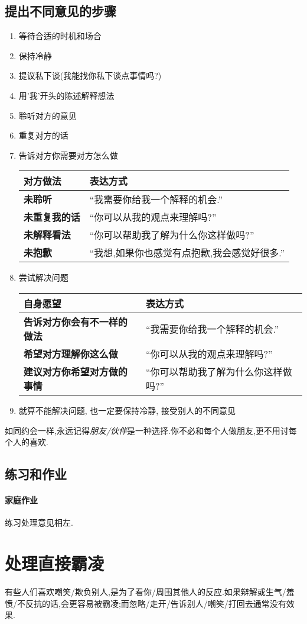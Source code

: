 \documentclass[UTF8]{article}
\newcommand{\Exer}{\subsection{练习和作业}}
\newcommand{\exer}{\paragraph*{家庭作业}}
\begin{document}
\subsection{提出不同意见的步骤}
\begin{enumerate}
    \item 等待合适的时机和场合
    \item 保持冷静
    \item 提议私下谈(我能找你私下谈点事情吗?)
    \item 用'我'开头的陈述解释想法
    \item 聆听对方的意见
    \item 重复对方的话
    \item 告诉对方你需要对方怎么做\begin{center}
    \begin{tabular}{l|l}
        \textbf{对方做法}&\textbf{表达方式}\\ \hline
        \textbf{未聆听}&``我需要你给我一个解释的机会.''\\
        \textbf{未重复我的话}&``你可以从我的观点来理解吗?''\\
        \textbf{未解释看法}&``你可以帮助我了解为什么你这样做吗?''\\
        \textbf{未抱歉}&``我想,如果你也感觉有点抱歉,我会感觉好很多.''\\
    \end{tabular}
    \end{center}
    \item 尝试解决问题\begin{center}
    \begin{tabular}{l|l}
        \textbf{自身愿望}&\textbf{表达方式}\\ \hline
        \textbf{告诉对方你会有不一样的做法}&``我需要你给我一个解释的机会.''\\
        \textbf{希望对方理解你这么做}&``你可以从我的观点来理解吗?''\\
        \textbf{建议对方你希望对方做的事情}&``你可以帮助我了解为什么你这样做吗?''\\
    \end{tabular}
    \end{center}
    \item 就算不能解决问题, 也一定要保持冷静, 接受别人的不同意见
\end{enumerate}
如同约会一样,永远记得\emph{朋友/伙伴}是一种选择.你不必和每个人做朋友,更不用讨每个人的喜欢.
\Exer \exer 练习处理意见相左.

\newpage
\section{处理直接霸凌}
有些人们喜欢嘲笑/欺负别人,是为了看你/周围其他人的反应.如果辩解或生气/羞愤/不反抗的话,会更容易被霸凌;而忽略/走开/告诉别人/嘲笑/打回去通常没有效果.
\end{document}
